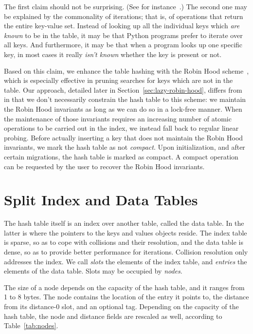 The first claim should not be surprising.
(See for instance~\cite[\S13.1]{art-mp}.)
The second one may be explained by the commonality of iterations; that is, of operations that return the entire key-value set.
Instead of looking up all the individual keys which \emph{are known} to be in the table, it may be that Python programs prefer to iterate over all keys.
And furthermore, it may be that when a program looks up one specific key, in most cases it really \emph{isn't known} whether the key is present or not.

Based on this claim, we enhance the table hashing with the Robin Hood scheme~\cite{robin-hood,bolt}, which is especially effective in pruning searches for keys which are not in the table.
Our approach, detailed later in Section~\ref{sec:lazy-robin-hood}, differs from~\cite{bolt} in that we don't necessarily constrain the hash table to this scheme: we maintain the Robin Hood invariants as long as we can do so in a lock-free manner.
When the maintenance of those invariants requires an increasing number of atomic operations to be carried out in the index, we instead fall back to regular linear probing.
Before actually inserting a key that does not maintain the Robin Hood invariants, we mark the hash table as not \emph{compact}.
Upon initialization, and after certain migrations, the hash table is marked as compact.
A compact operation can be requested by the user to recover the Robin Hood invariants.


\section{Split Index and Data Tables}\label{sec:python-dict}

The hash table itself is an index over another table, called the data table.
In the latter is where the pointers to the keys and values objects reside.
The index table is sparse, so as to cope with collisions and their resolution, and the data table is dense, so as to provide better performance for iterations.
Collision resolution only addresses the index.
We call \emph{slots} the elements of the index table, and \emph{entries} the elements of the data table.
Slots may be occupied by \emph{nodes}.

The size of a node depends on the capacity of the hash table, and it ranges from 1 to 8 bytes.
The node contains the location of the entry it points to, the distance from its distance-0 slot, and an optional tag.
Depending on the capacity of the hash table, the node and distance fields are rescaled as well, according to Table~\ref{tab:nodes}.

